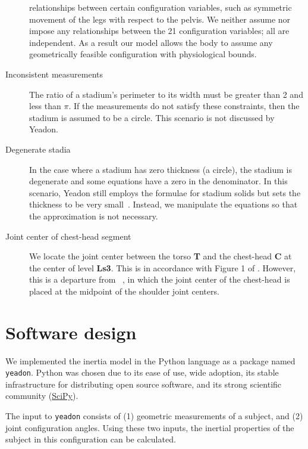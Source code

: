 \documentclass[10pt,a4paper,twocolumn]{article}
\begin{document}
\begin{description}
        relationships between certain configuration variables, such as
        symmetric movement of the legs with respect to the pelvis. We neither
        assume nor impose any relationships between the 21 configuration
        variables; all are independent. As a result our model allows the body to
        assume any geometrically feasible
        configuration with physiological bounds.
    \item[Inconsistent measurements] The ratio of a stadium's perimeter to its
        width must be greater than 2 and less than $\pi$. If the measurements do not satisfy these constraints, then the
        stadium is assumed to be a circle. This scenario is not discussed by Yeadon.
    \item[Degenerate stadia] In the case where a stadium has zero
        thickness (a circle), the stadium is degenerate and some equations have
        a zero in the denominator. In this scenario, Yeadon still employs the
        formulae for stadium solids but sets the thickness to be very
        small~\cite{Yeadon1990f}.  Instead, we manipulate the equations so
        that the approximation is not necessary.
    \item[Joint center of chest-head segment] We locate the joint center
        between the torso \textbf{T} and the chest-head \textbf{C} at the
        center of level \textbf{Ls3}. This is in accordance with Figure 1 of
        \cite{Yeadon1990e}. However, this is a departure from ~\cite{Yeadon1984a}, in which the joint center of
        the chest-head is placed at the midpoint of the shoulder joint centers.
\end{description}

\section*{Software design}

We implemented the inertia model in the Python language as a package named \verb+yeadon+.
Python was chosen due to its ease of use, wide adoption, its stable
infrastructure for distributing open source software, and its strong scientific
community (\href{http://www.scipy.org}{SciPy}).

The input to \verb+yeadon+ consists of (1) geometric measurements of a subject, and (2) joint configuration angles. Using these two inputs, the inertial properties of the subject in this configuration can be calculated.
\end{document}
